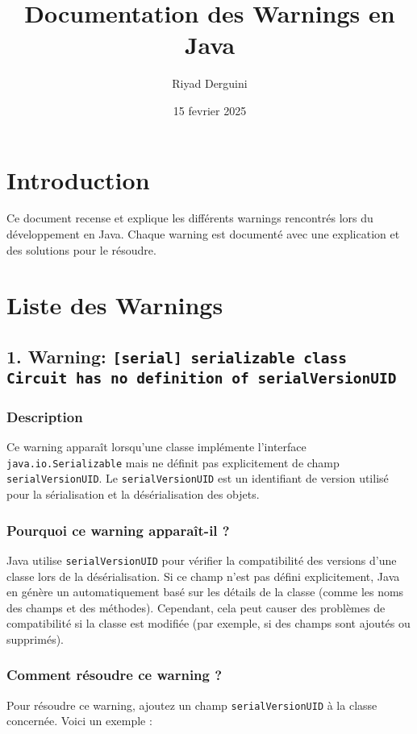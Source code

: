 \documentclass[a4paper,12pt]{article}
\title{Documentation des Warnings en Java}
\author{Riyad Derguini}
\date{15 fevrier 2025}
\begin{document}
\maketitle

\section*{Introduction}
Ce document recense et explique les différents warnings rencontrés lors du développement en Java. Chaque warning est documenté avec une explication et des solutions pour le résoudre.

\section*{Liste des Warnings}

\subsection*{1. Warning: \texttt{[serial] serializable class Circuit has no definition of serialVersionUID}}

\subsubsection*{Description}
Ce warning apparaît lorsqu'une classe implémente l'interface \texttt{java.io.Serializable} mais ne définit pas explicitement de champ \texttt{serialVersionUID}. Le \texttt{serialVersionUID} est un identifiant de version utilisé pour la sérialisation et la désérialisation des objets.

\subsubsection*{Pourquoi ce warning apparaît-il ?}
Java utilise \texttt{serialVersionUID} pour vérifier la compatibilité des versions d'une classe lors de la désérialisation. Si ce champ n'est pas défini explicitement, Java en génère un automatiquement basé sur les détails de la classe (comme les noms des champs et des méthodes). Cependant, cela peut causer des problèmes de compatibilité si la classe est modifiée (par exemple, si des champs sont ajoutés ou supprimés).

\subsubsection*{Comment résoudre ce warning ?}
Pour résoudre ce warning, ajoutez un champ \texttt{serialVersionUID} à la classe concernée. Voici un exemple :
\end{document}
